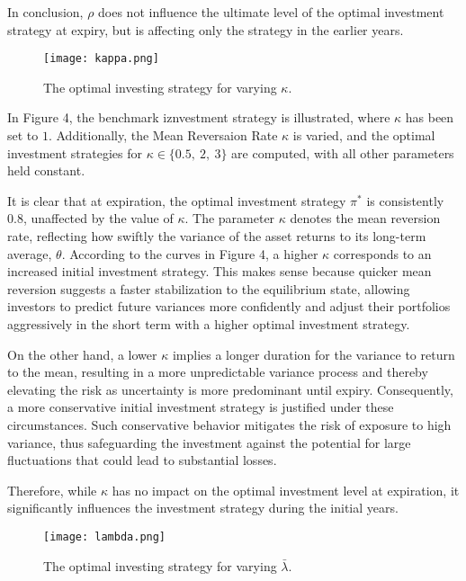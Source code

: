 \documentclass[11pt]{article}
\numberwithin{equation}{section}
\begin{document}
In conclusion, $\rho$ does not influence the ultimate level of the optimal
investment strategy at expiry, but is affecting only the strategy in the earlier
years.

\begin{figure}[!h]
    \centering
    \hspace*{-2cm}
    \texttt{[image: kappa.png]}
    \label{Figure 4}
    \setlength{\abovecaptionskip}{-5pt}
    \caption{The optimal investing strategy for varying $\kappa$.}
\end{figure}

In Figure 4, the benchmark iznvestment strategy is illustrated, where $\kappa$ has
been set to $1$. Additionally, the Mean Reversaion Rate $\kappa$ is varied, and the
optimal investment strategies for $\kappa \in \{0.5,\: 2, \:3\}$ are computed,
with all other parameters held constant.

It is clear that at expiration, the optimal investment strategy $\pi^*$ is
consistently 0.8, unaffected by the value of $\kappa$. The parameter $\kappa$
denotes the mean reversion rate, reflecting how swiftly the variance of the
asset returns to its long-term average, $\theta$. According to the curves in
Figure 4, a
higher $\kappa$ corresponds to an increased initial investment strategy. This
makes sense because quicker mean reversion suggests a faster stabilization to
the equilibrium state, allowing investors to predict future variances more
confidently and adjust their portfolios aggressively in the short term with a
higher optimal investment strategy.

On the other hand, a lower $\kappa$ implies a longer duration for the variance to return to the mean, resulting in a more unpredictable variance process and thereby elevating the risk as uncertainty is more predominant until expiry. Consequently, a more conservative initial investment strategy is justified under these circumstances. Such conservative behavior mitigates the risk of exposure to high variance, thus safeguarding the investment against the potential for large fluctuations that could lead to substantial losses.

Therefore, while $\kappa$ has no impact on the optimal investment level at expiration, it significantly influences the investment strategy during the initial years.

\newpage
\begin{figure}[!h]
    \centering
    \hspace*{-2cm}
    \texttt{[image: lambda.png]}
    \label{Figure 5}
    \setlength{\abovecaptionskip}{-5pt}
    \caption{The optimal investing strategy for varying $\bar{\lambda}$.}
\end{figure}
\end{document}
